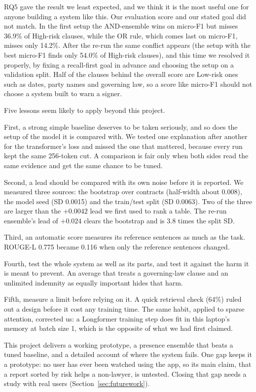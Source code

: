 RQ5 gave the result we least expected, and we think it is the most useful one for anyone building a system like this. Our evaluation score and our stated goal did not match. In the first setup the AND-ensemble wins on micro-F1 but misses 36.9\% of High-risk clauses, while the OR rule, which comes last on micro-F1, misses only 14.2\%. After the re-run the same conflict appears (the setup with the best micro-F1 finds only 54.0\% of High-risk clauses), and this time we resolved it properly, by fixing a recall-first goal in advance and choosing the setup on a validation split. Half of the clauses behind the overall score are Low-risk ones such as dates, party names and governing law, so a score like micro-F1 should not choose a system built to warn a signer.

Five lessons seem likely to apply beyond this project.

First, a strong simple baseline deserves to be taken seriously, and so does the setup of the model it is compared with. We tested one explanation after another for the transformer's loss and missed the one that mattered, because every run kept the same 256-token cut. A comparison is fair only when both sides read the same evidence and get the same chance to be tuned.

Second, a lead should be compared with its own noise before it is reported. We measured three sources: the bootstrap over contracts (half-width about 0.008), the model seed (SD 0.0015) and the train/test split (SD 0.0063). Two of the three are larger than the $+0.0042$ lead we first used to rank a table. The re-run ensemble's lead of $+0.024$ clears the bootstrap and is 3.8 times the split SD.

Third, an automatic score measures its reference sentences as much as the task. ROUGE-L 0.775 became 0.116 when only the reference sentences changed.

Fourth, test the whole system as well as its parts, and test it against the harm it is meant to prevent. An average that treats a governing-law clause and an unlimited indemnity as equally important hides that harm.

Fifth, measure a limit before relying on it. A quick retrieval check (64\%) ruled out a design before it cost any training time. The same habit, applied to sparse attention, corrected us: a Longformer training step does fit in this laptop's memory at batch size 1, which is the opposite of what we had first claimed.

This project delivers a working prototype, a presence ensemble that beats a tuned baseline, and a detailed account of where the system fails. One gap keeps it a prototype: no user has ever been watched using the app, so its main claim, that a report sorted by risk helps a non-lawyer, is untested. Closing that gap needs a study with real users (Section~\ref{sec:futurework}).

